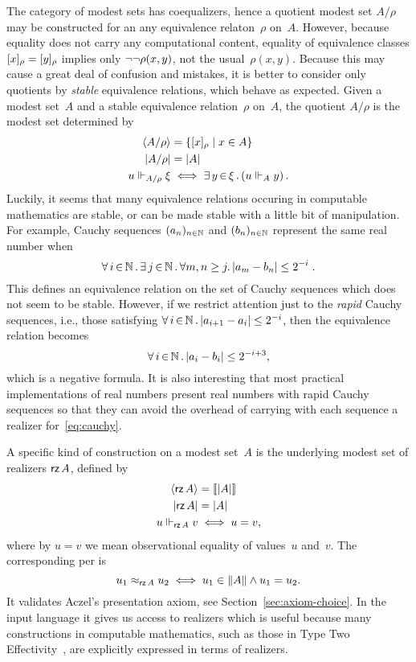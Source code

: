 The category of modest sets has coequalizers, hence a quotient modest
set $A/\rho$ may be constructed for an any equivalence relaton~$\rho$
on~$A$. However, because equality does not carry any computational
content, equality of equivalence classes $[x]_{\rho} =
[y]_{\rho}$ implies only $\lnot \lnot \rho(x,y)$, not the
usual~$\rho(x,y)$. Because this may cause a great deal of confusion
and mistakes, it is better to consider only quotients by \emph{stable}
equivalence relations, which behave as expected.
%
Given a modest set~$A$ and a stable equivalence relation~$\rho$
on~$A$, the quotient $A/\rho$ is the modest set determined by
%
\begin{align*}
  \langle A/\rho \rangle &= \{[x]_{\rho} \mid x \in A\} \\
  |A/\rho| &= |A| \\
  u \Vdash_{A/\rho} \xi &\iff \exists\, y \,{\in}\, \xi\,.\left(u \Vdash_A y\right).
\end{align*}
%
Luckily, it seems that many equivalence relations occuring in
computable mathematics are stable, or can be made stable with a little
bit of manipulation. For example, Cauchy sequences $(a_n)_{n\in\mathbb{N}}$
and $(b_n)_{n\in\mathbb{N}}$ represent the same real number when
%
\begin{equation}
  \label{eq:cauchy}%
  \xall{i}{\NN}{
    \xsome{j}{\NN}{
      \forall m,n \geq j.\,|a_m - b_n| \leq 2^{-i}
    }
  } \;.
\end{equation}
%
This defines an equivalence relation on the set of Cauchy sequences
which does not seem to be stable. However, if we restrict attention
just to the \emph{rapid} Cauchy sequences, i.e., those satisfying
$\forall\, i \,{\in}\, \mathbb{N}\,.\,|a_{i+1} - a_i| \leq 2^{-i}$, then the equivalence
relation becomes
%
\begin{equation*}
  \forall\, i \,{\in}\, \mathbb{N}\,.\,|a_i - b_i| \leq 2^{-i+3},
\end{equation*}
%
which is a negative formula. It is also interesting that most
practical implementations of real numbers present real numbers with
rapid Cauchy sequences so that they can avoid the overhead of carrying
with each sequence a realizer for~\eqref{eq:cauchy}.

A specific kind of construction on a modest set~$A$ is the underlying
modest set of realizers $\textsf{rz}\,A$, defined by
%
\begin{align*}
  \langle \textsf{rz}\,A \rangle &= [\![|A|]\!] \\
  |\textsf{rz}\,A| &= |A| \\
  u \Vdash_{\textsf{rz}\,A} v &\iff u = v,
\end{align*}
%
where by $u = v$ we mean observational equality of values~$u$ and~$v$.
The corresponding per is
%
\begin{equation*}
  u_1 \approx_{\textsf{rz}\,A} u_2 \iff u_1 \in \|A\| \land u_1 = u_2.
\end{equation*}
%
It validates Aczel's presentation axiom, see
Section~\ref{sec:axiom-choice}. In the input language it gives us
access to realizers which is useful because many constructions in
computable mathematics, such as those in Type Two
Effectivity~\cite{Wei00}, are explicitly expressed in terms of
realizers.


